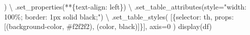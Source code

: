 \documentclass[
  letterpaper,
  DIV=11,
  numbers=noendperiod]{scrreprt}
\newenvironment{Shaded}{\begin{snugshade}}{\end{snugshade}}
\newcommand{\DecValTok}[1]{\textcolor[rgb]{0.68,0.00,0.00}{#1}}
\newcommand{\NormalTok}[1]{\textcolor[rgb]{0.00,0.23,0.31}{#1}}
\newcommand{\OperatorTok}[1]{\textcolor[rgb]{0.37,0.37,0.37}{#1}}
\newcommand{\StringTok}[1]{\textcolor[rgb]{0.13,0.47,0.30}{#1}}
\begin{document}
\begin{Shaded}
\begin{Highlighting}[]
\NormalTok{  ) }\OperatorTok{\textbackslash{}}
\NormalTok{  .set\_properties(}\OperatorTok{**}\NormalTok{\{}\StringTok{\textquotesingle{}text{-}align\textquotesingle{}}\NormalTok{: }\StringTok{\textquotesingle{}left\textquotesingle{}}\NormalTok{\}) }\OperatorTok{\textbackslash{}}
\NormalTok{  .set\_table\_attributes(}\StringTok{\textquotesingle{}style="width: 100\%; border: 1px solid black;"\textquotesingle{}}\NormalTok{) }\OperatorTok{\textbackslash{}}
\NormalTok{  .set\_table\_styles(}
\NormalTok{    [\{}\StringTok{\textquotesingle{}selector\textquotesingle{}}\NormalTok{: }\StringTok{\textquotesingle{}th\textquotesingle{}}\NormalTok{, }\StringTok{\textquotesingle{}props\textquotesingle{}}\NormalTok{: [(}\StringTok{\textquotesingle{}background{-}color\textquotesingle{}}\NormalTok{, }\StringTok{\textquotesingle{}\#f2f2f2\textquotesingle{}}\NormalTok{), (}\StringTok{\textquotesingle{}color\textquotesingle{}}\NormalTok{, }\StringTok{\textquotesingle{}black\textquotesingle{}}\NormalTok{)]\}],}
\NormalTok{    axis}\OperatorTok{=}\DecValTok{0}
\NormalTok{  )}
\NormalTok{display(df)}
\end{Highlighting}
\end{Shaded}
\end{document}
